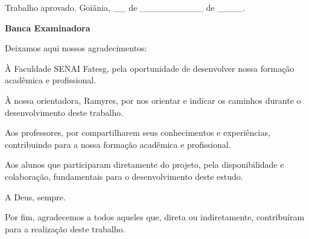 \documentclass[
	12pt,       %
	oneside,    %
	a4paper,    %
	english,    %
	brazilian   %
]{abntex2}
\begin{document}
\frenchspacing 

\imprimircapa

\imprimirfolhaderosto

\begin{folhadeaprovacao}
  \begin{center}
    {\ABNTEXchapterfont\large\imprimirautor}

    \vspace*{\fill}\vspace*{\fill}
    {\ABNTEXchapterfont\bfseries\Large\imprimirtitulo}
    \vspace*{\fill}
  \end{center}

  \noindent\justifying\imprimirpreambulo
  \vspace*{\fill}

  \noindent Trabalho aprovado. Goiânia, \_\_ de \_\_\_\_\_\_\_\_\_\_ de \_\_\_\_.

   \vspace{0.5cm}
   \begin{center}
     \textbf{Banca Examinadora}
   \end{center}


  \begin{center}
    \vspace*{0.5cm}
    {\large\imprimirlocal}
    \par
    {\large\imprimirdata}
    \vspace*{1cm}
  \end{center}
\end{folhadeaprovacao}

\begin{agradecimentos}
Deixamos aqui nossos agradecimentos:

À Faculdade SENAI Fatesg, pela oportunidade de desenvolver nossa formação acadêmica e profissional.

À nossa orientadora, Ramyres, por nos orientar e indicar os caminhos durante o desenvolvimento deste trabalho.

Aos professores, por compartilharem seus conhecimentos e experiências, contribuindo para a nossa formação acadêmica e profissional.

Aos alunos que participaram diretamente do projeto, pela disponibilidade e colaboração, fundamentais para o desenvolvimento deste estudo.

A Deus, sempre.

Por fim, agradecemos a todos aqueles que, direta ou indiretamente, contribuíram para a realização deste trabalho.
\end{agradecimentos}
\end{document}
